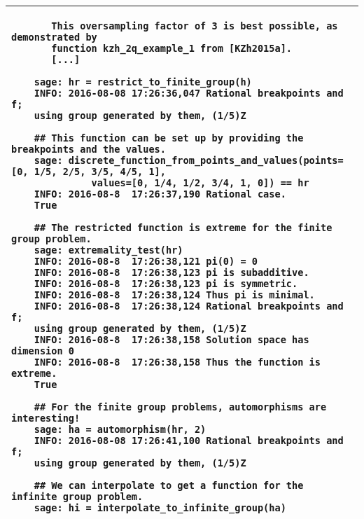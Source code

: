 \documentclass[10pt,reqno]{amsart}
\begin{document}
\begin{table}
\begin{tabular}{@{}p{\linewidth}@{}}
\begin{verbatim}
	   This oversampling factor of 3 is best possible, as demonstrated by
	   function kzh_2q_example_1 from [KZh2015a].
	   [...]

	sage: hr = restrict_to_finite_group(h)
	INFO: 2016-08-08 17:26:36,047 Rational breakpoints and f; 
	using group generated by them, (1/5)Z
	
	## This function can be set up by providing the breakpoints and the values.
	sage: discrete_function_from_points_and_values(points=[0, 1/5, 2/5, 3/5, 4/5, 1], 
	          values=[0, 1/4, 1/2, 3/4, 1, 0]) == hr
	INFO: 2016-08-8  17:26:37,190 Rational case.
	True

	## The restricted function is extreme for the finite group problem.
	sage: extremality_test(hr)
	INFO: 2016-08-8  17:26:38,121 pi(0) = 0
	INFO: 2016-08-8  17:26:38,123 pi is subadditive.
	INFO: 2016-08-8  17:26:38,123 pi is symmetric.
	INFO: 2016-08-8  17:26:38,124 Thus pi is minimal.
	INFO: 2016-08-8  17:26:38,124 Rational breakpoints and f; 
	using group generated by them, (1/5)Z
	INFO: 2016-08-8  17:26:38,158 Solution space has dimension 0
	INFO: 2016-08-8  17:26:38,158 Thus the function is extreme.
	True
	
	## For the finite group problems, automorphisms are interesting!
	sage: ha = automorphism(hr, 2)
	INFO: 2016-08-08 17:26:41,100 Rational breakpoints and f; 
	using group generated by them, (1/5)Z
	
	## We can interpolate to get a function for the infinite group problem.
	sage: hi = interpolate_to_infinite_group(ha)
	\end{verbatim}
    \\
    \bottomrule
  \end{tabular}
\end{table}
\end{document}
